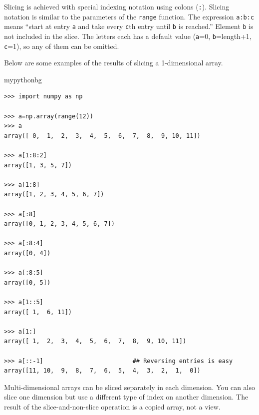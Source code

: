 Slicing is achieved with special indexing notation using colons (\texttt{:}).
Slicing notation is similar to the parameters of the \texttt{range} function.
The expression \texttt{a:b:c} means ``start at entry \texttt{a} and take every \texttt{c}th entry until \texttt{b} is reached.''
Element \texttt{b} is not included in the slice.
The letters each has a default value (\texttt{a}=0, \texttt{b}=length+1, \texttt{c}=1),
so any of them can be omitted.

Below are some examples of the results of slicing a 1-dimensional array.
\begin{tsession}{mypythonbg}
\begin{verbatim}
>>> import numpy as np

>>> a=np.array(range(12))
>>> a
array([ 0,  1,  2,  3,  4,  5,  6,  7,  8,  9, 10, 11])

>>> a[1:8:2]
array([1, 3, 5, 7])

>>> a[1:8]
array([1, 2, 3, 4, 5, 6, 7])

>>> a[:8]
array([0, 1, 2, 3, 4, 5, 6, 7])

>>> a[:8:4]
array([0, 4])

>>> a[:8:5]
array([0, 5])

>>> a[1::5]
array([ 1,  6, 11])

>>> a[1:]
array([ 1,  2,  3,  4,  5,  6,  7,  8,  9, 10, 11])

>>> a[::-1]                         ## Reversing entries is easy
array([11, 10,  9,  8,  7,  6,  5,  4,  3,  2,  1,  0])
\end{verbatim}
\end{tsession}
Multi-dimensional arrays can be sliced separately in each dimension.
You can also slice one dimension but use a different type of index on another dimension.
The result of the slice-and-non-slice operation is a copied array, not a view.

